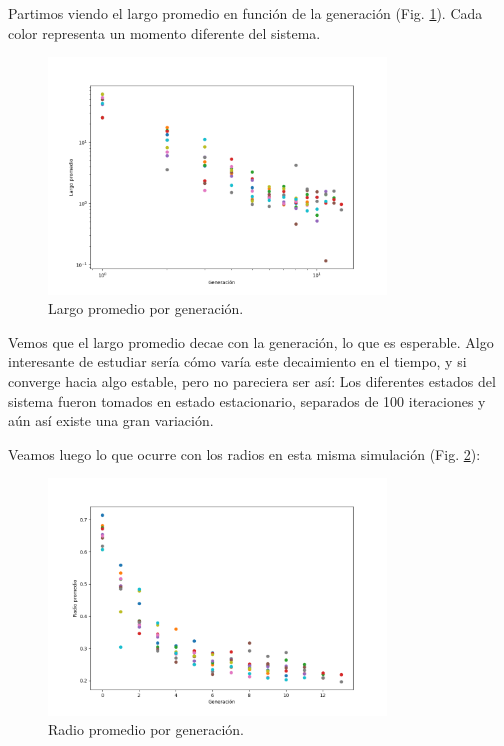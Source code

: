 \documentclass{article}
\begin{document}
Partimos viendo el largo promedio en función de la generación (Fig. \ref{fig:largo_vs_gen}). Cada color representa un momento diferente del sistema.

\begin{figure}[h!]
    \centering
    \includegraphics[width=0.8\textwidth]{graficos_inst/largo_vs_gen.png}
    \caption{Largo promedio por generación.}
    \label{fig:largo_vs_gen}
\end{figure}

Vemos que el largo promedio decae con la generación, lo que es esperable. Algo interesante de estudiar sería cómo varía este decaimiento en el tiempo, y si converge hacia algo estable, pero no pareciera ser así: Los diferentes estados del sistema fueron tomados en estado estacionario, separados de 100 iteraciones y aún así existe una gran variación.

Veamos luego lo que ocurre con los radios en esta misma simulación (Fig. \ref{fig:radio_vs_gen}):

\begin{figure}[h!]
    \centering
    \includegraphics[width=0.8\textwidth]{graficos_inst/radio_vs_gen.png}
    \caption{Radio promedio por generación.}
    \label{fig:radio_vs_gen}
\end{figure}
\end{document}
